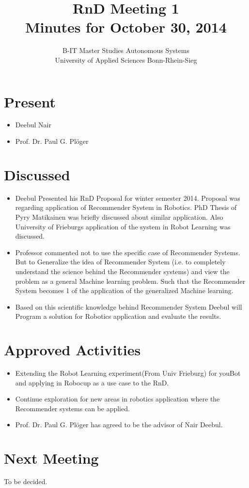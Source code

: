 \documentclass[a4paper]{report}
\title{\textbf{RnD Meeting 1} \\
		Minutes for October 30, 2014}
\author{B-IT Master Studies Autonomous Systems\\
		University of Applied Sciences Bonn-Rhein-Sieg\\
		}
\date{}
\begin{document}
\maketitle

\section{Present}
\begin{itemize}
	\item Deebul Nair
	\item Prof. Dr. Paul G. Pl{\"o}ger
\end{itemize}
\section{Discussed}
\begin{itemize}
	\item Deebul Presented his RnD Proposal for winter semester 2014. Proposal was regarding application of Recommender System in Robotics. PhD Thesis of Pyry Matikainen was briefly discussed about similar application. Also University of Frieburgs application of the system in Robot Learning was discussed.
	\item Professor commented not to use the specific case of Recommender Systems. But to Generalize the idea of Recommender System (i.e. to completely understand the science behind the Recommender systems) and view the problem as a general Machine learning problem. Such that the Recommender System becomes 1 of the application of the generalized Machine learning.
	\item Based on this scientific knowledge behind Recommender System Deebul will Program a solution  for Robotics application and evaluate the results.

\end{itemize}

\section{Approved Activities}
\begin{itemize}
	\item Extending the Robot Learning experiment(From Univ Frieburg) for youBot and applying in Robocup as a use case to the RnD.
	\item Continue exploration for new areas in robotics application where the Recommender systems can be applied.
	\item Prof. Dr. Paul G. Pl{\"o}ger has agreed to be the advisor of Nair Deebul.
\end{itemize}

\section{Next Meeting}
To be decided.
\end{document}
